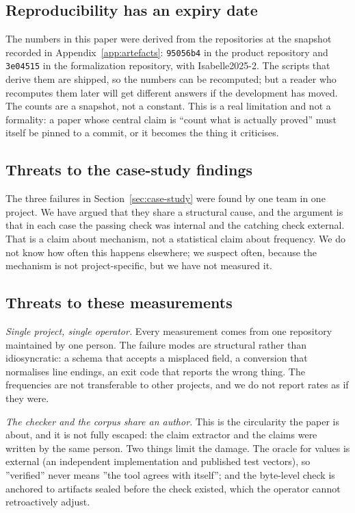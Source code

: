 \subsection{Reproducibility has an expiry date}

The numbers in this paper were derived from the repositories at the snapshot
recorded in Appendix~\ref{app:artefacts}: \texttt{95056b4} in the product
repository and \texttt{3e04515} in the formalization repository, with
Isabelle2025-2. The scripts that derive them are shipped, so the numbers can be
recomputed; but a reader who recomputes them later will get different answers if
the development has moved. The counts are a snapshot, not a constant. This is a
real limitation and not a formality: a paper whose central claim is
``count what is actually proved'' must itself be pinned to a commit, or it
becomes the thing it criticises.

\subsection{Threats to the case-study findings}

The three failures in Section~\ref{sec:case-study} were found by one team in one
project. We have argued that they share a structural cause, and the argument is
that in each case the passing check was internal and the catching check external.
That is a claim about mechanism, not a statistical claim about frequency. We do
not know how often this happens elsewhere; we suspect often, because the
mechanism is not project-specific, but we have not measured it.

\subsection{Threats to these measurements}
\emph{Single project, single operator.} Every measurement comes from one
repository maintained by one person. The failure modes are structural rather
than idiosyncratic: a schema that accepts a misplaced field, a conversion that
normalises line endings, an exit code that reports the wrong thing. The
frequencies are not transferable to other projects, and we do not report rates
as if they were.

\emph{The checker and the corpus share an author.} This is the circularity the
paper is about, and it is not fully escaped: the claim extractor and the claims
were written by the same person. Two things limit the damage. The oracle for
values is external (an independent implementation and published test vectors),
so ''verified'' never means ''the tool agrees with itself''; and the byte-level
check is anchored to artifacts sealed before the check existed, which the
operator cannot retroactively adjust.

